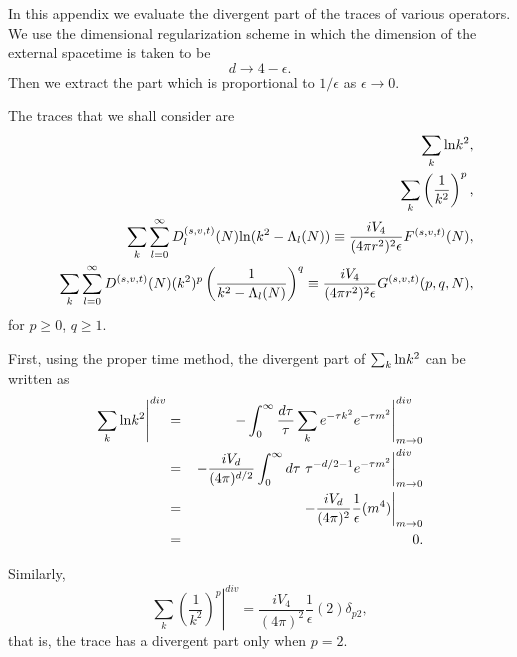 \documentclass[a4paper,aps,preprint,groupedaddress,showpacs]{revtex4}
\begin{document}
In this appendix we evaluate the divergent part of the traces
of various operators. We use the dimensional regularization
scheme in which the dimension of the external spacetime is taken
to be
\begin{equation}
d\rightarrow 4-\epsilon.
\end{equation}
Then we extract the part which is proportional to 
$1/\epsilon$ as $\epsilon\rightarrow 0$. 

The traces that we shall consider are
\begin{eqnarray}
&&\sum_{k}{\rm ln}k^{2},
\nonumber\\
&&\sum_{k}\left(\frac{1}{k^{2}}\right)^{p},
\nonumber\\
&&\sum_{k}\sum^{\infty}_{l=0}{D^{(s,v,t)}_{l}}(N)
{\rm ln}(k^{2}-\Lambda_{l}(N))\equiv
\frac{iV_{4}}{(4\pi r^{2})^{2}\epsilon}F^{(s,v,t)}(N),
\nonumber\\
&&\sum_{k}\sum^{\infty}_{l=0}D^{(s,v,t)}(N)(k^{2})^{p}
\left(\frac{1}{k^{2}-\Lambda_{l}(N)}\right)^{q}\equiv
\frac{iV_{4}}{(4\pi r^{2})^{2}\epsilon}G^{(s,v,t)}(p,q,N),
\end{eqnarray}
for $p\geq 0$, $q\geq 1$.

First, using the proper time method, the divergent part of 
$\sum_{k}{\rm ln}k^{2}$ can be written as
\begin{eqnarray}
\left.\sum_{k}{\rm ln}k^{2}\right\vert^{div}
&=&\left.-\int^{\infty}_{0}\frac{d\tau}{\tau}
\sum_{k}e^{-\tau k^{2}}e^{-\tau m^{2}}
\right\vert^{div}_{m\rightarrow 0}
\nonumber\\
&=&\left.-\frac{iV_{d}}{(4\pi)^{d/2}}\int^{\infty}_{0}
d\tau\ \tau^{-d/2-1}e^{-\tau m^{2}}
\right\vert^{div}_{m\rightarrow 0}
\nonumber\\
&=&\left.-\frac{iV_{d}}{(4\pi)^{2}}\frac{1}{\epsilon}(m^{4})
\right\vert_{m\rightarrow 0}
\nonumber\\
&=&0.
\end{eqnarray}

Similarly,
\begin{equation}
\left.\sum_{k}\left(\frac{1}{k^{2}}\right)^{p}\right\vert^{div}
=\frac{iV_{4}}{(4\pi)^{2}}\frac{1}{\epsilon}(2)\delta_{p2},
\end{equation}
that is, the trace has a divergent part only when $p=2$.
\end{document}
